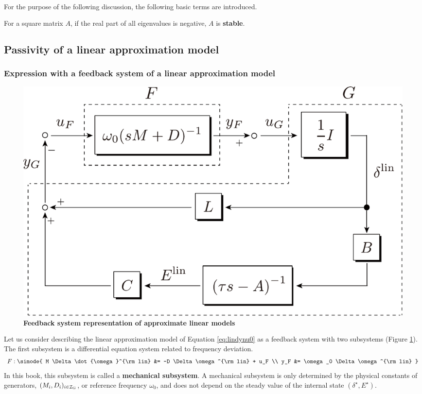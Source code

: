 \documentclass[graybox, envcountchap]{svmult}
\begin{document}
For the purpose of the following discussion, the following basic terms are introduced.

\begin{definition}
\label{def:matsta}
For a square matrix $A$, if the real part of all eigenvalues is negative, $A$ is \textbf{stable}.
\end{definition}

\subsection{Passivity of a linear approximation model\advanced}\label{sec:linpasana}

\smallskip
\subsubsection{Expression with a feedback system of a linear approximation model}

\begin{figure}[t]
\centering
\includegraphics[width = .7\linewidth]{figs/FandG}
\medskip
\caption{\textbf{Feedback system representation of approximate linear models}}
\label{fig:GandG}
\medskip
\end{figure}


Let us consider describing the linear approximation model of Equation \ref{eq:lindynu0} as a feedback system with two subsystems (Figure \ref{fig:GandG}).
The first subsystem is a differential equation system related to frequency deviation.
\begin{align}\label{eq:Fss}
F: \simode{
M \Delta \dot{\omega}^{\rm lin} &= -D \Delta \omega^{\rm lin}
+
u_F \\
y_F &= \omega_0 \Delta \omega^{\rm lin}
}
\end{align}
In this book, this subsystem is called a \textbf{mechanical subsystem}.
A mechanical subsystem is only determined by the physical constants of generators, $(M_i,D_i)_{i\in \mathcal{I}_{\rm G}}$, or reference frequency $\omega_0$, and does not depend on the steady value of the internal state $(\delta^{\star},E^{\star})$.
\end{document}
